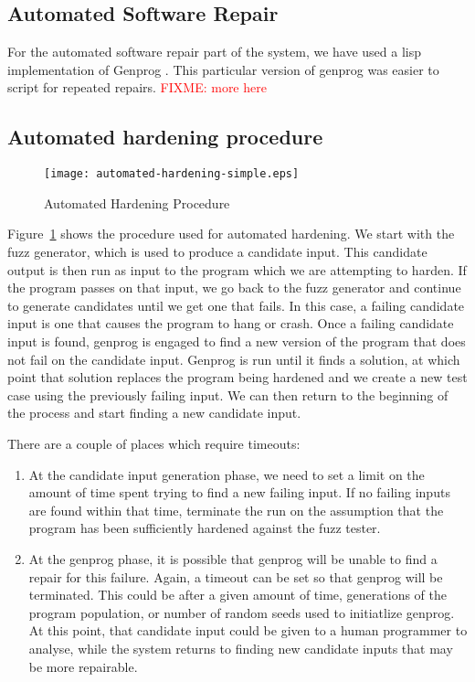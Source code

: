 \documentclass[conference]{IEEEtran}
\newcommand{\FIXME}[1]{\textcolor{red}{FIXME: #1}}
\begin{document}
\subsection{Automated Software Repair}

For the automated software repair part of the system, we have used a lisp
implementation of Genprog \cite{genprogpapers}.   This particular version of
genprog was easier to script for repeated repairs.  \FIXME{more here}

\subsection{Automated hardening procedure}

\begin{figure}[htb]
  \caption{Automated Hardening Procedure}
  \label{fig:flowchart}
  \centering
    \texttt{[image: automated-hardening-simple.eps]}
%
\end{figure}


Figure~\ref{fig:flowchart} shows the procedure used for automated hardening.  We
start with the fuzz generator, which is used to produce a candidate input.
This candidate output is then run as input to the program which we are
attempting to harden.  If the program passes on that input, we go back to the
fuzz generator and continue to generate candidates until we get one that fails.
In this case, a failing candidate input is one that causes the program to hang
or crash.  Once a failing candidate input is found, genprog is engaged to find a
new version of the program that does not fail on the candidate input.  Genprog
is run until it finds a solution, at which point that solution replaces the
program being hardened and we create a new test case using the previously
failing input.  We can then return to the beginning of the process and start
finding a new candidate input.

There are a couple of places which require timeouts: 

\begin{enumerate}
\item At the candidate input
generation phase, we need to set a limit on the amount of time spent trying to
find a new failing input.  If no failing inputs are found within that time,
terminate the run on the assumption that the program has been sufficiently
hardened against the fuzz tester.

\item At the genprog phase, it is possible that genprog will be unable to find
a repair for this failure.  Again, a timeout can be set so that genprog will be
terminated.  This could be after a given amount of time, generations of the
program population, or number of random seeds used to initiatlize genprog.  At
this point, that candidate input could be given to a human programmer to
analyse, while the system returns to finding new candidate inputs that may be
more repairable.
\end{enumerate}
\end{document}
